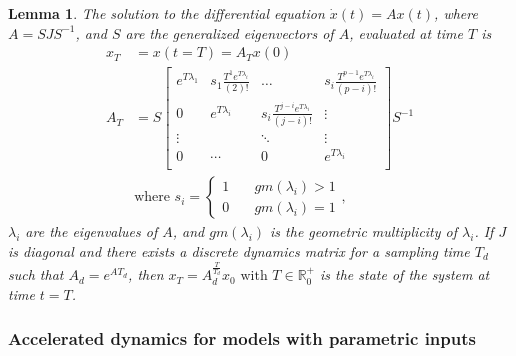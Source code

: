 \documentclass[twocolumn]{autart}    %
\newcommand{\mat}[1]{{#1}}
\renewcommand{\vec}[1]{{#1}}
\newtheorem{lemma}{Lemma}
\begin{document}
\begin{lemma}
The solution to the differential equation $\dot{\vec{x}}(t)=\mat{A}\vec{x}(t)$, where $\mat{A}=\mat{S}\mat{J}\mat{S}^{-1}$, and $\mat{S}$ are the generalized eigenvectors of $\mat{A}$,
evaluated at time $T$ is
%
\begin{align}
 \vec{x}_T&=\vec{x}(t=T)=\mat{A}_{T}\vec{x} (0)\\
 \mat{A}_{T}&= \mat{S}
 \left [ \begin{array}{cccc}
 e^{T\lambda_1}  & s_1\frac{T^{1}e^{T\lambda_i}}{(2)!} & \hdots  & s_i\frac{T^{p-1}e^{T\lambda_i}}{(p-i)!} \\
0 & e^{T\lambda_i}  & s_i\frac{T^{j-i}e^{T\lambda_i}}{(j-i)!} & \vdots \\
\vdots & & \ddots & \vdots \\
0 & \cdots & 0  &e^{T\lambda_i} \\
\end{array} \right ]
 \mat{S}^{-1}
 \label{eq:continuous_tube_dyn2}\\
 &\text{where } s_i=\left\{\begin{array}{cc}1&\quad gm(\lambda_i)>1\\0&\quad gm(\lambda_i)=1\end{array}\right.,\nonumber
\end{align}
%
$\lambda_i$ are the eigenvalues of $\mat{A}$, and $gm(\lambda_i)$ is the geometric multiplicity of $\lambda_i$.
%
If $\mat{J}$ is diagonal and there exists a discrete dynamics matrix for a sampling time $T_d$ such that $A_d=e^{\mat{A} T_d}$, then $\vec{x}_T=A_d^{\frac{T}{T_d}}\vec{x}_0 \text{ with } T \in \mathbb{R}^+_0$ is the state of the system at time $t=T$. 
\end{lemma}

\subsubsection{Accelerated dynamics for models with parametric inputs}\label{sec:real_discrete_param_inputs}
\end{document}
